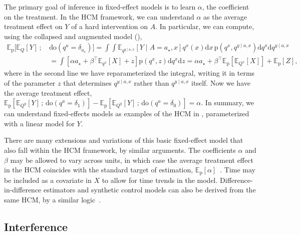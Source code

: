 \documentclass[12pt]{article}
\newcommand{\rmdo}{\mathrm{do}}
\newcommand{\s}{\, ; \,}
\newcommand{\di}{\mathrm{d}}
\newcommand{\pr}{\mathrm{p}}
\begin{document}
The primary goal of inference in fixed-effect models is to learn $\alpha$, the coefficient on the treatment. In the HCM framework, we can understand $\alpha$ as the average treatment effect on $Y$ of a hard intervention on $A$. In particular, we can compute, using the collapsed and augmented model (),
\begin{equation}
\begin{split}
	\mathbb{E}_\pr[\mathbb{E}_{Q}[Y] \s &\rmdo(q^a = \delta_{a_\star})] = \int \int \mathbb{E}_{q^{y \mid a, x}}[Y \mid A = a_\star, x] q^x(x) \di x\, \pr(q^x, q^{y \mid a,x}) \di q^x \di q^{y \mid a,x}\\
	 & = \int [\alpha a_\star + \beta^\top\mathbb{E}_{q^x}[X] + z] \pr(q^x, z) \di q^x \di z
	= \alpha a_\star + \beta^\top\mathbb{E}_\pr[\mathbb{E}_{Q^x}[X]] + \mathbb{E}_\pr[Z],
\end{split}
\end{equation}
where in the second line we have reparameterized the integral, writing it in terms of the parameter $z$ that determines $q^{y \mid a, x}$ rather than $q^{y \mid a, x}$ itself.
Now we have the average treatment effect,
$\mathbb{E}_\pr[\mathbb{E}_{Q^y}[Y] \s \rmdo(q^a = \delta_1)] -  \mathbb{E}_\pr[\mathbb{E}_{Q^y}[Y] \s \rmdo(q^a = \delta_0)] = \alpha$.                                                                                                                         
In summary, we can understand fixed-effects models as examples of the HCM in , parameterized with a linear model for $Y$. 

There are many extensions and variations of this basic fixed-effect model that also fall within the HCM framework, by similar arguments. 
The coefficients $\alpha$ and $\beta$ may be allowed to vary across units, in which case the average treatment effect in the HCM coincides with the standard target of estimation, $\mathbb{E}_\pr[\alpha]$~\citep{Wooldridge2005-bk}.
Time may be included as a covariate in $X$ to allow for time trends in the model.
Difference-in-difference estimators and synthetic control models can also be derived from the same HCM, by a similar logic~\citep{Abadie2010-nn}.


\subsection{Interference} \label{apx:interference}
\end{document}
